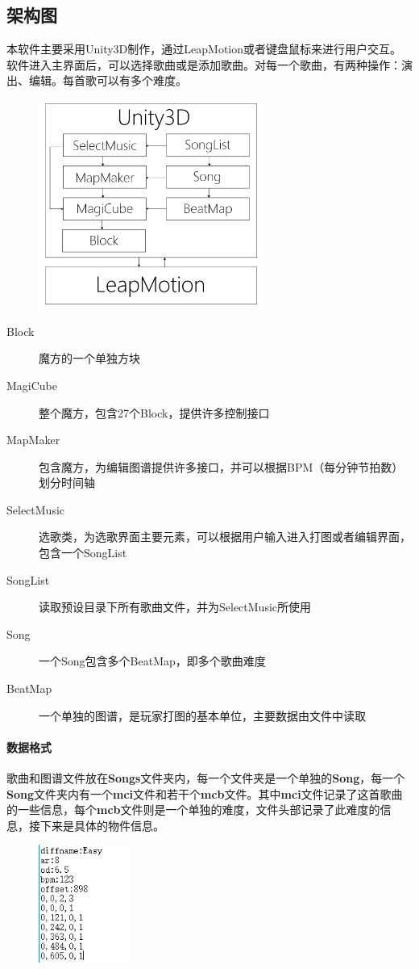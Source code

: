 \documentclass{article}
\begin{document}
\subsection{架构图}
本软件主要采用Unity3D制作，通过LeapMotion或者键盘鼠标来进行用户交互。软件进入主界面后，可以选择歌曲或是添加歌曲。对每一个歌曲，有两种操作：演出、编辑。每首歌可以有多个难度。
\begin{figure}[H]
  \centering
  \includegraphics[width=20em]{arc.png}\\
  \caption{}\label{}
\end{figure}
\begin{description}
  \item[Block] 魔方的一个单独方块
  \item[MagiCube] 整个魔方，包含27个Block，提供许多控制接口
  \item[MapMaker] 包含魔方，为编辑图谱提供许多接口，并可以根据BPM（每分钟节拍数）划分时间轴
  \item[SelectMusic] 选歌类，为选歌界面主要元素，可以根据用户输入进入打图或者编辑界面，包含一个SongList
  \item[SongList] 读取预设目录下所有歌曲文件，并为SelectMusic所使用
  \item[Song] 一个Song包含多个BeatMap，即多个歌曲难度
  \item[BeatMap] 一个单独的图谱，是玩家打图的基本单位，主要数据由文件中读取
\end{description}
\paragraph{数据格式}
歌曲和图谱文件放在\textbf{Songs}文件夹内，每一个文件夹是一个单独的\textbf{Song}，每一个\textbf{Song}文件夹内有一个\textbf{mci}文件和若干个\textbf{mcb}文件。其中\textbf{mci}文件记录了这首歌曲的一些信息，每个\textbf{mcb}文件则是一个单独的难度，文件头部记录了此难度的信息，接下来是具体的物件信息。
\begin{figure}[H]
  \centering
  \includegraphics[width=8em]{mci.png}\\
  \caption{}\label{}
\end{figure}
\end{document}
